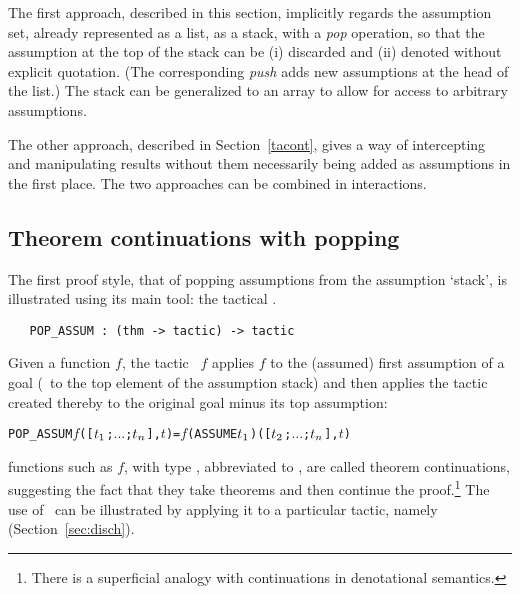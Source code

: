 The first
approach, described in this section, implicitly regards the assumption
set, already represented as a list, as a stack, with a {\it pop\/}
operation, so that the assumption at the top of the stack can be (i) discarded
and (ii) denoted without explicit quotation.  (The corresponding {\it push\/}
adds new assumptions at the head of the list.)
The stack can be generalized to an array to allow for access to
arbitrary assumptions.

The other approach, described in Section~\ref{tacont},
gives a way of intercepting and manipulating results without them necessarily
being added as assumptions in the first place.  The two approaches can
be combined in \HOL{} interactions.


\subsection{Theorem continuations with popping}

The first proof style, that of popping assumptions
from the assumption `stack',
is illustrated using its main tool: the tactical .

\begin{holboxed}\begin{verbatim}
   POP_ASSUM : (thm -> tactic) -> tactic
\end{verbatim}\end{holboxed}

\noindent Given a function $f$, the tactic
\ $f$ applies $f$ to the (assumed) first
assumption of a goal (\ie\ to the top element of the assumption stack)
and then applies the tactic created thereby to the original goal
minus its top assumption:

\begin{hol}\begin{alltt}
   POP_ASSUM \(f\) ([\(t\sb{1}\);\(\ldots\);\(t\sb{n}\)],\(t\)) = \(f\) (ASSUME \(t\sb{1}\)) ([\(t\sb{2}\);\(\ldots\);\(t\sb{n}\)],\(t\))
\end{alltt}\end{hol}

\noindent \ML{} functions such as $f$,
with type , abbreviated to ,
are called theorem continuations,
 suggesting the fact that they
take theorems and then continue the proof.\footnote{There is a superficial analogy
with continuations in denotational semantics.}
The use of \ can be illustrated by applying it
to a particular tactic, namely  (Section~\ref{sec:disch}).

